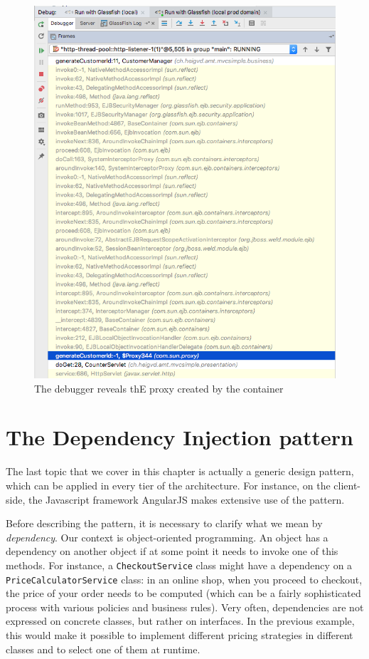 \begin{figure}[]
	\centering
    \includegraphics[width=0.9\linewidth]{Figures/debugger-slsb.png}
	\caption{The debugger reveals thE proxy created by the container}
  \label{fig:debugger-slsb}
\end{figure}

\section{The Dependency Injection pattern}

The last topic that we cover in this chapter is actually a generic design pattern, which can be applied in every tier of the architecture. For instance, on the client-side, the Javascript framework AngularJS makes extensive use of the pattern.


Before describing the pattern, it is necessary to clarify what we mean by \emph{dependency}. Our context is object-oriented programming. An object has a dependency on another object if at some point it needs to invoke one of this methods. For instance, a \texttt{CheckoutService} class might have a dependency on a \texttt{PriceCalculatorService} class: in an online shop, when you proceed to checkout, the price of your order needs to be computed (which can be a fairly sophisticated process with various policies and business rules). Very often, dependencies are not expressed on concrete classes, but rather on interfaces. In the previous example, this would make it possible to implement different pricing strategies in different classes and to select one of them at runtime.

